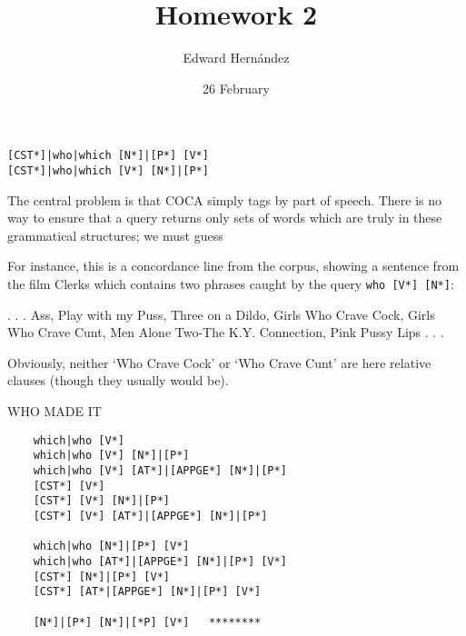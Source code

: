 \documentclass[doc,12pt]{apa6}
\begin{document}
\title{Homework 2}
\author{Edward Hern\'{a}ndez}
\date{26 February}
\maketitle

\begin{verbatim}
[CST*]|who|which [N*]|[P*] [V*]
[CST*]|who|which [V*] [N*]|[P*]
\end{verbatim}

The central problem is that COCA simply tags by part of speech. There is
no way to ensure that a query returns only sets of words which are truly
in these grammatical structures; we must guess

For instance, this is a concordance line from the corpus, showing a sentence
from the film Clerks which contains two phrases caught by the query
\texttt{who\ {[}V*{]}\ {[}N*{]}}:
\begin{exe}
	\ex . . . Ass, Play with my Puss, Three on a Dildo, Girls Who Crave Cock, Girls Who Crave Cunt, Men Alone Two-The K.Y. Connection, Pink Pussy Lips . . .
\end{exe}
Obviously, neither `Who Crave Cock' or `Who Crave Cunt' are here relative
clauses (though they usually would be).

WHO MADE IT

\begin{verbatim}
	which|who [V*]
	which|who [V*] [N*]|[P*]
	which|who [V*] [AT*]|[APPGE*] [N*]|[P*]
	[CST*] [V*]
	[CST*] [V*] [N*]|[P*]
	[CST*] [V*] [AT*]|[APPGE*] [N*]|[P*]

	which|who [N*]|[P*] [V*]
	which|who [AT*]|[APPGE*] [N*]|[P*] [V*]
	[CST*] [N*]|[P*] [V*]
	[CST*] [AT*|[APPGE*] [N*]|[P*] [V*]
	
	[N*]|[P*] [N*]|[*P] [V*]   ********
\end{verbatim}
\end{document}

